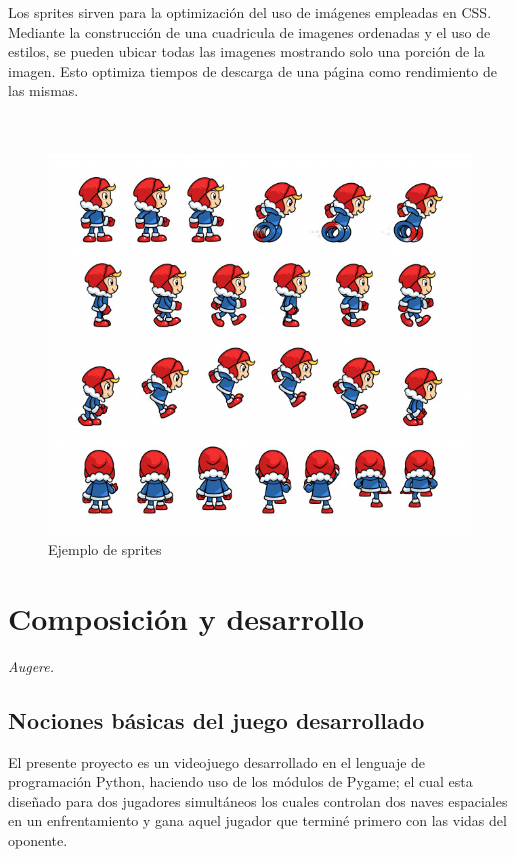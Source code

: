 \documentclass[12pt,letterpaper]{report}
\begin{document}
Los sprites sirven para la optimización del uso de imágenes empleadas en CSS. Mediante la construcción de una cuadricula de imagenes ordenadas y el uso de estilos, se pueden ubicar todas las imagenes mostrando solo una porción de la imagen. Esto optimiza tiempos de descarga de una página como rendimiento de las mismas.
\\ \\ \\
\begin{figure}[h]
\begin{center}

\includegraphics[scale=0.5]{../../SecondGame/esquimal.jpg} 
\caption{Ejemplo de sprites}
\end{center}
\end{figure}


\chapter{Composición y desarrollo}
\textit{Augere.}

\section{Nociones básicas del juego desarrollado}

El presente proyecto es un videojuego desarrollado en el lenguaje de programación Python, haciendo uso de los módulos de Pygame; el cual esta diseñado para dos jugadores simultáneos los cuales controlan dos naves espaciales en un enfrentamiento y gana aquel jugador que terminé primero con las vidas del oponente.
\end{document}
